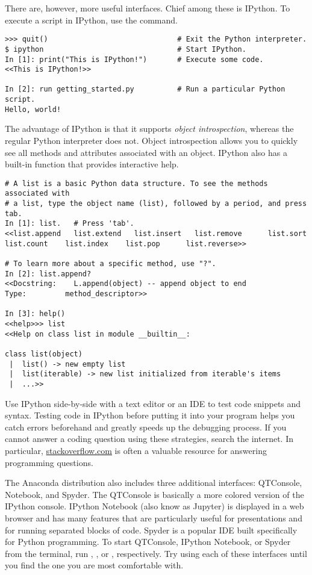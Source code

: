 There are, however, more useful interfaces.
Chief among these is IPython.
To execute a script in IPython, use the  command.

\begin{lstlisting}
>>> quit()                              # Exit the Python interpreter.
$ ipython                               # Start IPython.
In [1]: print("This is IPython!")       # Execute some code.
<<This is IPython!>>

In [2]: run getting_started.py          # Run a particular Python script.
Hello, world!
\end{lstlisting}

The advantage of IPython is that it supports \emph{object introspection}, whereas the regular Python interpreter does not.
Object introspection allows you to quickly see all methods and attributes associated with an object.
IPython also has a built-in  function that provides interactive help.

\begin{lstlisting}
# A list is a basic Python data structure. To see the methods associated with
# a list, type the object name (list), followed by a period, and press tab.
In [1]: list.   # Press 'tab'.
<<list.append   list.extend   list.insert   list.remove      list.sort
list.count    list.index    list.pop      list.reverse>>

# To learn more about a specific method, use "?".
In [2]: list.append?
<<Docstring:    L.append(object) -- append object to end
Type:         method_descriptor>>

In [3]: help()
<<help>>> list
<<Help on class list in module __builtin__:

class list(object)
 |  list() -> new empty list
 |  list(iterable) -> new list initialized from iterable's items
 |  ...>>
\end{lstlisting}

Use IPython side-by-side with a text editor or an IDE to test code snippets and syntax.
Testing code in IPython before putting it into your program helps you catch errors beforehand and greatly speeds up the debugging process.
If you cannot answer a coding question using these strategies, search the internet.
In particular, \href{http://stackoverflow.com/}{stackoverflow.com} is often a valuable resource for answering programming questions.

The Anaconda distribution also includes three additional interfaces: QTConsole, Notebook, and Spyder.
The QTConsole is basically a more colored version of the IPython console.
IPython Notebook (also know as Jupyter) is displayed in a web browser and has many features that are particularly useful for presentations and for running separated blocks of code.
Spyder is a popular IDE built specifically for Python programming.
To start QTConsole, IPython Notebook, or Spyder from the terminal, run , , or , respectively.
Try using each of these interfaces until you find the one you are most comfortable with.


